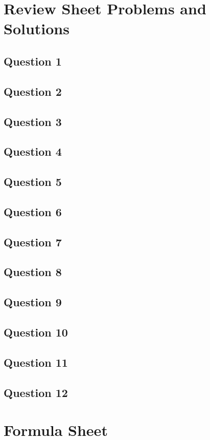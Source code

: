 \documentclass{article}
\begin{document}
\newpage
\section{Review Sheet Problems and Solutions}

\subsection{Question 1}



\subsection{Question 2}



\subsection{Question 3}

\subsection{Question 4}

\subsection{Question 5}

\subsection{Question 6}

\subsection{Question 7}

\subsection{Question 8}

\subsection{Question 9}

\subsection{Question 10}

\subsection{Question 11}

\subsection{Question 12}


\newpage
\section{Formula Sheet}
\end{document}
